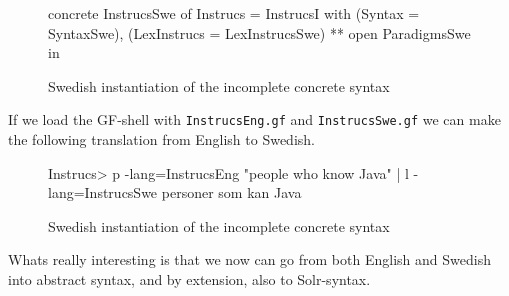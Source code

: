 \begin{figure}[H]
\begin{code}
concrete InstrucsSwe of Instrucs = InstrucsI with 
                                             (Syntax = SyntaxSwe), 
                                             (LexInstrucs = LexInstrucsSwe) 
                                             ** open ParadigmsSwe in {}
\end{code}
\caption{Swedish instantiation of the incomplete concrete syntax}
\end{figure}

If we load the GF-shell with \texttt{InstrucsEng.gf} and \texttt{InstrucsSwe.gf} we can make the following translation from English to Swedish.

\begin{figure}[H]
\begin{code}
Instrucs> p -lang=InstrucsEng "people who know Java" | l -lang=InstrucsSwe
personer som kan Java
\end{code}
\caption{Swedish instantiation of the incomplete concrete syntax}
\end{figure}
Whats really interesting is that we now can go from both English and Swedish into abstract syntax, and by extension, also to Solr-syntax.